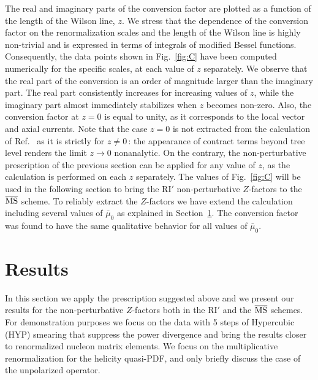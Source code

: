 \documentclass[12pt,tighten,nofootinbib,amssymb,floatfix]{article}
\newcommand{\MSb}{{\overline{\rm MS}}}
\begin{document}
\medskip
The real and imaginary parts of the conversion factor are plotted as a function of the length of the Wilson 
line, $z$. We stress that the dependence of the conversion factor on the renormalization scales and the length of the 
Wilson line is highly non-trivial and is expressed in terms of integrals of modified Bessel functions. Consequently, the data points
shown in Fig.~\ref{fig:C} have been computed numerically for the specific scales, at each value of $z$ separately. We observe
that the real part of the conversion is an order of magnitude larger than the imaginary part. The real part consistently increases 
for increasing values of $z$, while the imaginary part almost immediately stabilizes when $z$ becomes non-zero. Also, the conversion 
factor at $z{=}0$ is equal to unity, as it corresponds to the local vector and axial currents. Note that the case $z{=}0$ is not extracted
from the calculation of Ref.~\cite{Constantinou:2017sej} as it is strictly for $z{\neq}0$\,: the appearance of contract terms beyond
tree level renders the limit $z\to 0$ nonanalytic. On the contrary, the non-perturbative prescription of the previous section
can be applied for any value of $z$, as the calculation is performed on each $z$ separately. The values of Fig.~\ref{fig:C} will be used
in the following section to bring the RI$'$ non-perturbative $Z$-factors to the $\MSb$ scheme. To reliably extract 
the $Z$-factors we have extend the calculation including several values of $\bar\mu_0$ as explained in Section~\ref{Sec3}. The conversion
factor was found to have the same qualitative behavior for all values of $\bar\mu_0$.

\section{Results}
\label{Sec3}

In this section we apply the prescription suggested above and we present our results for the non-perturbative $Z$-factors 
both in the RI$'$ and the $\MSb$ schemes. For demonstration purposes we focus on the data with 5 steps of Hypercubic (HYP) smearing that suppress 
the power divergence and bring the results closer to renormalized nucleon matrix elements. We focus on the multiplicative renormalization 
for the helicity quasi-PDF, and only briefly discuss the case of the unpolarized operator. 
\end{document}

